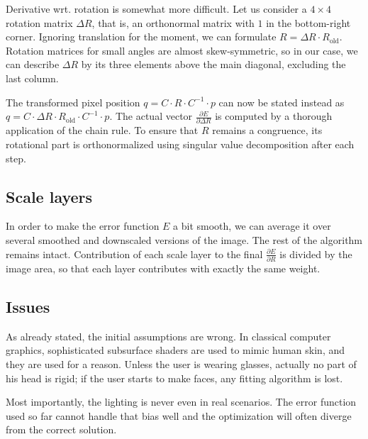 \documentclass[12pt]{article}
\begin{document}
Derivative wrt. rotation is somewhat more difficult.
Let us consider a $4 \times 4$ rotation matrix $\Delta R$, that is, an orthonormal matrix with $1$ in the bottom-right corner.
Ignoring translation for the moment, we can formulate $R = \Delta R \cdot R_{\mathrm{old}}$.
Rotation matrices for small angles are almost skew-symmetric, so in our case, we can describe $\Delta R$ by its three elements above the main diagonal, excluding the last column.

The transformed pixel position $q = C \cdot R \cdot C^{-1} \cdot p$ can now be stated instead as $q = C \cdot \Delta R \cdot R_{\mathrm{old}} \cdot C^{-1} \cdot p$.
The actual vector $\frac {\partial E} {\partial \Delta R}$ is computed by a thorough application of the chain rule.
To ensure that $R$ remains a congruence, its rotational part is orthonormalized using singular value decomposition after each step.

\subsection*{Scale layers}

In order to make the error function $E$ a bit smooth, we can average it over several smoothed and downscaled versions of the image.
The rest of the algorithm remains intact.
Contribution of each scale layer to the final $\frac {\partial E} {\partial R}$ is divided by the image area, so that each layer contributes with exactly the same weight.

\subsection*{Issues}

As already stated, the initial assumptions are wrong.
In classical computer graphics, sophisticated subsurface shaders are used to mimic human skin, and they are used for a reason.
Unless the user is wearing glasses, actually no part of his head is rigid; if the user starts to make faces, any fitting algorithm is lost.

Most importantly, the lighting is never even in real scenarios.
The error function used so far cannot handle that bias well and the optimization will often diverge from the correct solution.
\end{document}
